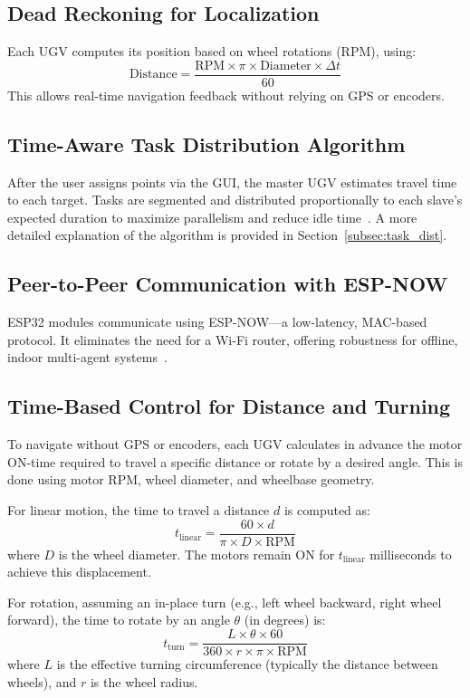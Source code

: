 \documentclass[conference]{IEEEtran}
\begin{document}
\subsection{Dead Reckoning for Localization}
Each UGV computes its position based on wheel rotations (RPM), using:
\begin{equation}
\text{Distance} = \frac{\text{RPM} \times \pi \times \text{Diameter} \times \Delta t}{60}
\end{equation}
This allows real-time navigation feedback without relying on GPS or encoders.

\subsection{Time-Aware Task Distribution Algorithm}
After the user assigns points via the GUI, the master UGV estimates travel time to each target. Tasks are segmented and distributed proportionally to each slave’s expected duration to maximize parallelism and reduce idle time~\cite{jin2024multi}. A more detailed explanation of the algorithm is provided in Section~\ref{subsec:task_dist}.

\subsection{Peer-to-Peer Communication with ESP-NOW}
ESP32 modules communicate using ESP-NOW—a low-latency, MAC-based protocol. It eliminates the need for a Wi-Fi router, offering robustness for offline, indoor multi-agent systems~\cite{espnowguide}.


\subsection{Time-Based Control for Distance and Turning}
To navigate without GPS or encoders, each UGV calculates in advance the motor ON-time required to travel a specific distance or rotate by a desired angle. This is done using motor RPM, wheel diameter, and wheelbase geometry.

For linear motion, the time to travel a distance $d$ is computed as:
\begin{equation}
t_{\text{linear}} = \frac{60 \times d}{\pi \times D \times \text{RPM}}
\end{equation}
where $D$ is the wheel diameter. The motors remain ON for $t_{\text{linear}}$ milliseconds to achieve this displacement.

For rotation, assuming an in-place turn (e.g., left wheel backward, right wheel forward), the time to rotate by an angle $\theta$ (in degrees) is:
\begin{equation}
t_{\text{turn}} = \frac{L \times \theta \times 60}{360 \times r \times \pi \times \text{RPM}}
\end{equation}
where $L$ is the effective turning circumference (typically the distance between wheels), and $r$ is the wheel radius.
\end{document}
